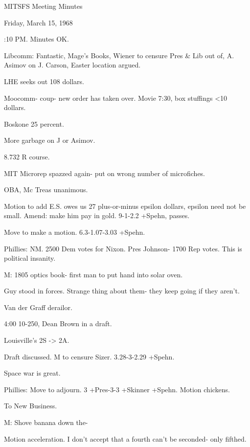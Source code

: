 \documentclass[12pt]{article}
\begin{document}
\begin{center}

MITSFS Meeting Minutes

Friday, March 15, 1968

\end{center}
 
\vspace{12pt}

\setlength{\parskip}{6pt}

:10 PM. Minutes OK.

Libcomm: Fantastic, Mage's Books, Wiener to censure Pres & Lib out of, A. Asimov on J. Carson, Easter location argued.

LHE seeks out 108 dollars.

Moocomm- coup- new order has taken over. Movie 7:30, box stuffings <10 dollars.

Boskone 25 percent.

More garbage on J or Asimov.

8.732 R course.

MIT Microrep spazzed again- put on wrong number of microfiches.

OBA, Mc Treas unanimous.

Motion to add E.S. owes us 27 plus-or-minus epsilon dollars, epsilon need not be small. Amend: make him pay in gold. 9-1-2.2 +Spehn, passes.

Move to make a motion. 6.3-1.07-3.03 +Spehn.

Phillies: NM. 2500 Dem votes for Nixon. Pres Johnson- 1700 Rep votes. This is political insanity.

M: 1805 optics book- first man to put hand into solar oven.

Guy stood in forces. Strange thing about them- they keep going if they aren't.

Van der Graff derailor.

4:00 10-250, Dean Brown in a draft.

Louisville's 2S -> 2A.

Draft discussed. M to censure Sizer. 3.28-3-2.29 +Spehn.

Space war is great.

Phillies: Move to adjourn. 3 +Pres-3-3 +Skinner +Spehn. Motion chickens.

To New Business.

M: Shove banana down the-

Motion acceleration. I don't accept that a fourth can't be seconded- only fifthed.
\end{document}

